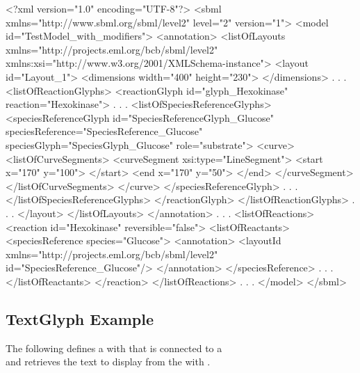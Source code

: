 \label{example:speciesreferenceid}
\begin{example}
<?xml version="1.0" encoding="UTF-8"?>
<sbml xmlns="http://www.sbml.org/sbml/level2" level="2" version="1">
  <model id="TestModel_with_modifiers">
    <annotation>
     <listOfLayouts xmlns="http://projects.eml.org/bcb/sbml/level2"
              xmlns:xsi="http://www.w3.org/2001/XMLSchema-instance">
      <layout id="Layout_1">
        <dimensions width="400" height="230">
        </dimensions>
              .
              .
              .
        <listOfReactionGlyphs>
          <reactionGlyph id="glyph_Hexokinase" reaction="Hexokinase">
                    .
                    .
                    .
            <listOfSpeciesReferenceGlyphs>
              <speciesReferenceGlyph id="SpeciesReferenceGlyph_Glucose"
                   speciesReference="SpeciesReference_Glucose"
                   speciesGlyph="SpeciesGlyph_Glucose" role="substrate">
                <curve>
                  <listOfCurveSegments>
                    <curveSegment xsi:type="LineSegment">
                      <start x="170" y="100">
                      </start>
                      <end x="170" y="50">
                      </end>
                    </curveSegment>
                  </listOfCurveSegments>
                </curve>
              </speciesReferenceGlyph>
                        .
                        .
                        . 
            </listOfSpeciesReferenceGlyphs>
          </reactionGlyph>
        </listOfReactionGlyphs>
             .
             .
             .
      </layout>
     </listOfLayouts>
    </annotation>
        .
        .
        .
    <listOfReactions>
      <reaction id="Hexokinase" reversible="false">
        <listOfReactants>
          <speciesReference species="Glucose">
            <annotation>
              <layoutId xmlns="http://projects.eml.org/bcb/sbml/level2"
                        id="SpeciesReference_Glucose"/>
            </annotation>
          </speciesReference>
                .
                .
                .
        </listOfReactants>
      </reaction>
    </listOfReactions>
          .
          .
          .  
  </model>
</sbml>
\end{example}


\subsection{TextGlyph Example}
The following defines a \TextGlyph with  that is connected to a \SpeciesGlyph \\  and retrieves the text to display from the \Species with .

